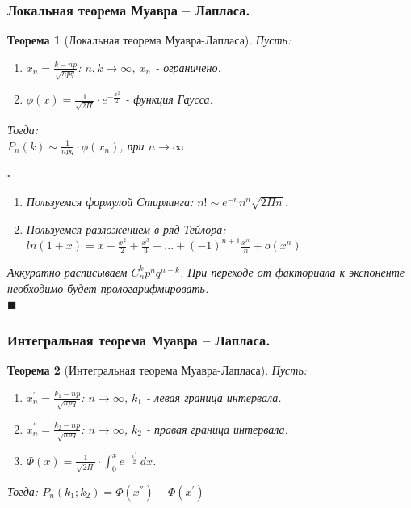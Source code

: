 \documentclass[14pt]{extarticle}
\theoremstyle{breakstyle}
\newtheorem{theorem}{Теорема}[subsection]
\begin{document}
\subsubsection{Локальная теорема Муавра – Лапласа.}
\begin{theorem}[Локальная теорема Муавра-Лапласа]

Пусть: 
\begin{enumerate}[noitemsep, topsep=0pt]
    \item $x_{n} = \frac{k-np}{\sqrt{npq}}$: $n, k \rightarrow \infty$, $x_{n}$ - ограничено.
    \item $\phi(x) = \frac{1}{\sqrt{2\Pi}} \cdot e^{-\frac{x^{2}}{2}}$ - функция Гаусса.
\end{enumerate}

Тогда:\\
$P_{n}(k) \sim \frac{1}{npq} \cdot \phi(x_{n})$, при $n \rightarrow \infty$

$\square$

\begin{enumerate}[noitemsep, topsep=0pt]
    \item Пользуемся формулой Стирлинга: $n! \sim e^{-n}n^{n}\sqrt{2\Pi n}$.
    \item Пользуемся разложением в ряд Тейлора: $ln(1+x) = x - \frac{x^{2}}{2} + \frac{x^3}{3} + ... + (-1)^{n+1} \frac{x^{n}}{n} + o(x^{n})$
\end{enumerate}

Аккуратно расписываем $C_{n}^{k}p^{n}q^{n-k}$. При переходе от факториала к экспоненте необходимо будет прологарифмировать. \\

\hfill$\blacksquare$

\end{theorem}

\subsubsection{Интегральная теорема Муавра – Лапласа.}
\begin{theorem}[Интегральная теорема Муавра-Лапласа]

Пусть: 
\begin{enumerate}[noitemsep, topsep=0pt]
    \item $x_{n}^{'} = \frac{k_{1}-np}{\sqrt{npq}}$: $n \rightarrow \infty$, $k_{1}$ - левая граница интервала.
    \item $x_{n}^{''} = \frac{k_{2}-np}{\sqrt{npq}}$: $n \rightarrow \infty$, $k_{2}$ - правая граница интервала.
    \item $\Phi(x) = \frac{1}{\sqrt{2\Pi}} \cdot \int_{0}^{x} e^{-\frac{x^{2}}{2}} \, dx$.
\end{enumerate}

Тогда:
$P_{n}(k_{1}; k_{2}) = \Phi(x^{''}) - \Phi(x^{'})$

\end{theorem}
\end{document}
